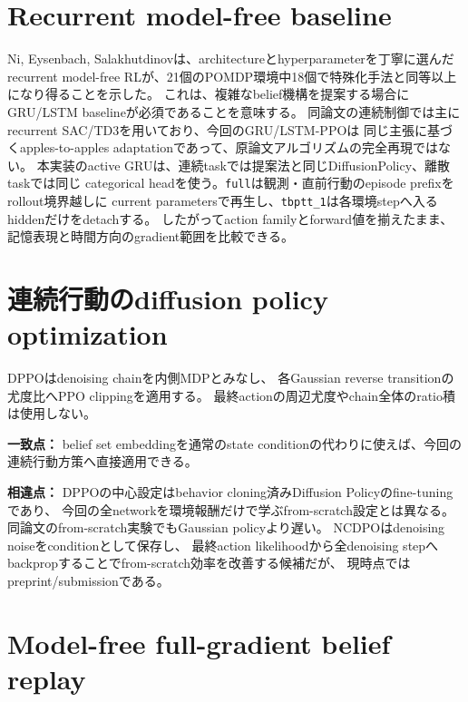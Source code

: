 \documentclass[a4paper,11pt]{article}
\newcommand{\matchpoint}{\par\noindent\textbf{一致点：}}
\newcommand{\difference}{\par\noindent\textbf{相違点：}}
\begin{document}
\section{Recurrent model-free baseline}

Ni, Eysenbach, Salakhutdinov\cite{ni2022recurrent}は、architectureとhyperparameterを丁寧に選んだ
recurrent model-free RLが、21個のPOMDP環境中18個で特殊化手法と同等以上になり得ることを示した。
これは、複雑なbelief機構を提案する場合にGRU/LSTM baselineが必須であることを意味する。
同論文の連続制御では主にrecurrent SAC/TD3を用いており、今回のGRU/LSTM-PPOは
同じ主張に基づくapples-to-apples adaptationであって、原論文アルゴリズムの完全再現ではない。
本実装のactive GRUは、連続taskでは提案法と同じDiffusionPolicy、離散taskでは同じ
categorical headを使う。\texttt{full}は観測・直前行動のepisode prefixをrollout境界越しに
current parametersで再生し、\texttt{tbptt\_1}は各環境stepへ入るhiddenだけをdetachする。
したがってaction familyとforward値を揃えたまま、記憶表現と時間方向のgradient範囲を比較できる。

\section{連続行動のdiffusion policy optimization}

DPPO\cite{ren2025dppo}はdenoising chainを内側MDPとみなし、
各Gaussian reverse transitionの尤度比へPPO clippingを適用する。
最終actionの周辺尤度やchain全体のratio積は使用しない。

\matchpoint
belief set embeddingを通常のstate conditionの代わりに使えば、今回の連続行動方策へ直接適用できる。

\difference
DPPOの中心設定はbehavior cloning済みDiffusion Policyのfine-tuningであり、
今回の全networkを環境報酬だけで学ぶfrom-scratch設定とは異なる。
同論文のfrom-scratch実験でもGaussian policyより遅い。
NCDPO\cite{yang2025ncdpo}はdenoising noiseをconditionとして保存し、
最終action likelihoodから全denoising stepへbackpropすることでfrom-scratch効率を改善する候補だが、
現時点ではpreprint/submissionである。

\section{Model-free full-gradient belief replay}
\end{document}
